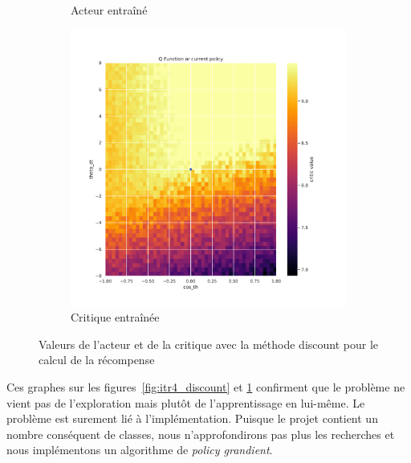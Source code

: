 \begin{figure}[H]
\begin{subfigure}{0.3\textwidth}
        \caption{Acteur entraîné}
    \end{subfigure}
    \begin{subfigure}{0.3\textwidth}
        \includegraphics[width=\textwidth]{figures/iteration4/0_critic_normalize_post_Pendulum-v0.pdf}
        \caption{Critique entraînée}
    \end{subfigure}
    \caption{Valeurs de l'acteur et de la critique avec la méthode discount pour le calcul de la récompense}
    \label{fig:itr4_normalize}
\end{figure}

Ces graphes sur les figures~\ref{fig:itr4_discount} et \ref{fig:itr4_normalize} confirment que le problème ne vient pas de l'exploration mais plutôt de l'apprentissage en lui-même. Le problème est surement lié à l'implémentation. Puisque le projet contient un nombre conséquent de classes, nous n'approfondirons pas plus les recherches et nous implémentons un algorithme de \emph{policy grandient}.